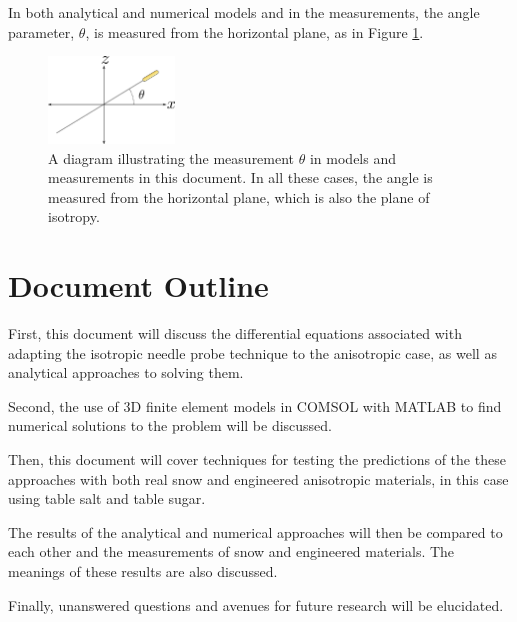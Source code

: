 In both analytical and numerical models and in the measurements, the angle
parameter, \(\theta\), is measured from the horizontal plane, as in Figure 
\ref{fig:angle}.

\begin{figure}[h]
\centering
\includegraphics[width=0.3\textwidth]{fig/angle.png}
\caption{A diagram illustrating the measurement \(\theta\) in models and
measurements in this document. In all these cases, the angle is measured from
the horizontal plane, which is also the plane of isotropy. }
\label{fig:angle}
\end{figure}


\section{Document Outline}

First, this document will discuss the differential equations associated with
adapting the isotropic needle probe technique to the anisotropic case, as well
as analytical approaches to solving them. 

Second, the use of 3D finite element models in COMSOL with MATLAB to find 
numerical solutions to the problem will be discussed.

Then, this document will cover techniques for testing the predictions of the
these approaches with both real snow and engineered anisotropic materials, in
this case using table salt and table sugar.

The results of the analytical and numerical approaches will then be compared to
each other and the measurements of snow and engineered materials. The meanings
of these results are also discussed.

Finally, unanswered questions and avenues for future research
will be elucidated.
